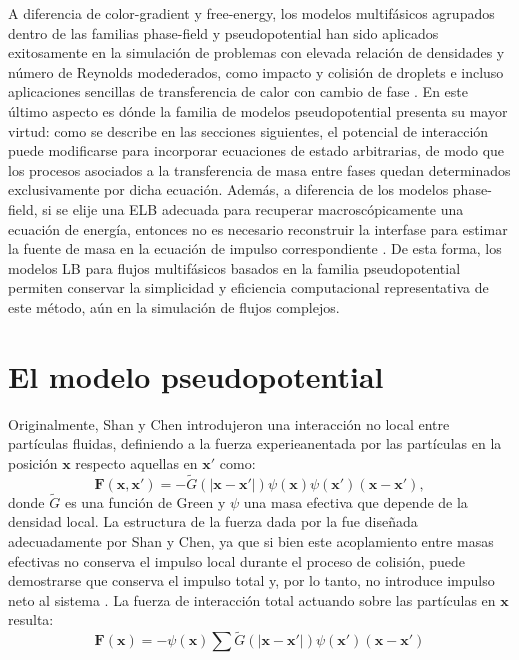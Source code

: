A diferencia de color-gradient y free-energy, los modelos multif\'asicos agrupados dentro de las familias phase-field y pseudopotential han sido aplicados exitosamente en la simulaci\'on de problemas con elevada relaci\'on de densidades y n\'umero de Reynolds modederados, como impacto y colisi\'on de droplets \cite{li_lattice_2013,lee_stable_2005} e incluso aplicaciones sencillas de transferencia de calor con cambio de fase \cite{safari_consistent_2014,markus_pool_2012,gong_lattice_2015}. En este \'ultimo aspecto es d\'onde la familia de modelos pseudopotential presenta su mayor virtud: como se describe en las secciones siguientes, el potencial de interacci\'on puede modificarse para incorporar ecuaciones de estado arbitrarias, de modo que los procesos asociados a la transferencia de masa entre fases quedan determinados exclusivamente por  dicha ecuaci\'on. Adem\'as, a diferencia de los modelos phase-field, si se elije una ELB adecuada para recuperar macrosc\'opicamente una ecuaci\'on de energ\'ia, entonces no es necesario reconstruir la interfase para estimar la fuente de masa en la ecuaci\'on de impulso correspondiente \cite{safari_consistent_2014,safari_extended_2013}. De esta forma, los modelos LB para flujos multif\'asicos basados en la familia pseudopotential permiten conservar la simplicidad y eficiencia computacional representativa de este m\'etodo, a\'un en la simulaci\'on de flujos complejos.


\section{El modelo pseudopotential}
Originalmente, Shan y Chen introdujeron una interacci\'on no local entre part\'iculas fluidas, definiendo a la fuerza experieanentada por las part\'iculas en la posici\'on $\bm{x}$ respecto aquellas en $\bm{x}'$ como:
\begin{equation}
	\bm{F}(\bm{x},\bm{x}') = -\tilde{G}(|\bm{x}-\bm{x}'|)\psi(\bm{x})\psi(\bm{x'})(\bm{x}-\bm{x}'),
	\label{eq:fint_green}
\end{equation}
donde $\tilde{G}$ es una funci\'on de Green y $\psi$ una masa efectiva que depende de la densidad local. La estructura de la fuerza dada por la  fue dise\~nada adecuadamente por Shan y Chen, ya que si bien este acoplamiento entre masas efectivas no conserva el impulso local durante el proceso de colisi\'on, puede demostrarse que conserva el impulso total y, por lo tanto, no introduce impulso neto al sistema \cite{shan_simulation_1994}. La fuerza de interacci\'on total actuando sobre las part\'iculas en $\bm{x}$ resulta:
\begin{equation}
	\bm{F}(\bm{x}) = -\psi(\bm{x}) \sum \tilde{G}(|\bm{x}-\bm{x}'|)\psi(\bm{x}')(\bm{x}-\bm{x}')
\end{equation}


